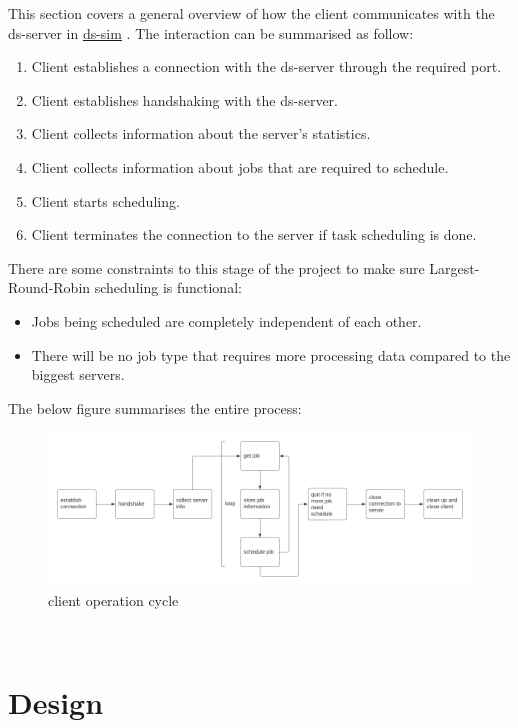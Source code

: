 \documentclass[a4paper]{article} %
\begin{document}
This section covers a general overview of how the client communicates with the ds-server in \href{https://github.com/distsys-MQ/ds-sim}{ds-sim} \cite{ds-sim}. The interaction can be summarised as follow:

\begin{enumerate}
    \item Client establishes a connection with the ds-server through the required port.
    \item Client establishes handshaking with the ds-server.
    \item Client collects information about the server's statistics.
    \item Client collects information about jobs that are required to schedule.
    \item Client starts scheduling.
    \item Client terminates the connection to the server if task scheduling is done. 
\end{enumerate}

There are some constraints to this stage of the project to make sure Largest-Round-Robin scheduling is functional:

\begin{itemize}
    \item Jobs being scheduled are completely independent of each other.
    \item There will be no job type that requires more processing data compared to the biggest servers.
\end{itemize}

The below figure summarises the entire process:
\begin{figure}[h!]
    \centering
    \includegraphics[scale = 0.25]{img/COMP3100 stage 1 diagram 1.png}
    \caption{client operation cycle}
    \label{fig:fig1}
\end{figure}\\

\section{Design}
\label{sec:section3}
\end{document}
